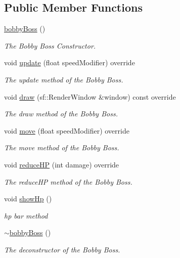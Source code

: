 \subsection*{Public Member Functions}
\begin{DoxyCompactItemize}
\item 
\hyperlink{classbobby_boss_ad9b35f38432e4b8944e315cceb5035fe}{bobby\+Boss} ()
\begin{DoxyCompactList}\small\item\em The Bobby Boss Constructor. \end{DoxyCompactList}\item 
void \hyperlink{classbobby_boss_a1ba19c55017f2fb3f0b1679d82095d78}{update} (float speed\+Modifier) override
\begin{DoxyCompactList}\small\item\em The update method of the Bobby Boss. \end{DoxyCompactList}\item 
void \hyperlink{classbobby_boss_a168f9c10b7ed7b371518a5d13a145221}{draw} (sf\+::\+Render\+Window \&window) const override
\begin{DoxyCompactList}\small\item\em The draw method of the Bobby Boss. \end{DoxyCompactList}\item 
void \hyperlink{classbobby_boss_aafebea4f0d69a0f84dc1f8af980cf93f}{move} (float speed\+Modifier) override
\begin{DoxyCompactList}\small\item\em The move method of the Bobby Boss. \end{DoxyCompactList}\item 
void \hyperlink{classbobby_boss_aae5b4a01ca776533c8a43a5a91d78af8}{reduce\+H\+P} (int damage) override
\begin{DoxyCompactList}\small\item\em The reduce\+H\+P method of the Bobby Boss. \end{DoxyCompactList}\item 
void \hyperlink{classbobby_boss_a63d3d9304aaff572a312e9662c80e226}{show\+Hp} ()
\begin{DoxyCompactList}\small\item\em hp bar method \end{DoxyCompactList}\item 
\hyperlink{classbobby_boss_a0bd41165ae0caf0af259eb705f2f9b24}{$\sim$bobby\+Boss} ()
\begin{DoxyCompactList}\small\item\em The deconstructor of the Bobby Boss. \end{DoxyCompactList}\end{DoxyCompactItemize}
